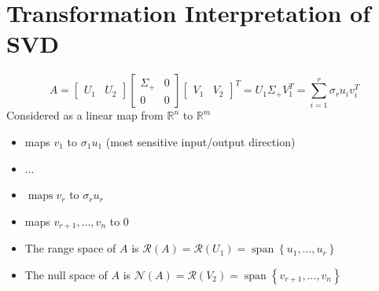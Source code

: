 \documentclass[10pt,a4paper,oneside]{article}
\begin{document}
\section{Transformation Interpretation of SVD}
\[
A=\left[\begin{array}{ll}{U_{1}} & {U_{2}}\end{array}\right]\left[\begin{array}{cc}{\Sigma_{+}} & {0} \\ {0} & {0}\end{array}\right]\left[\begin{array}{ll}{V_{1}} & {V_{2}}\end{array}\right]^{T}=U_{1} \Sigma_{+} V_{1}^{T}=\sum_{i=1}^{r} \sigma_{r} u_{i} v_{i}^{T}
\]
Considered as a linear map from $\mathbb{R}^{n}$ to $\mathbb{R}^{m}$
\begin{itemize}
\item maps $v_{1}$ to $\sigma_{1} u_{1}$ (most sensitive input/output direction)
\item ...
\item $\operatorname{maps} v_{r}$ to $\sigma_{r} u_{r}$
\item maps $v_{r+1}, \dots, v_{n}$ to 0
\item The range space of $A$ is $\mathcal{R}(A)=\mathcal{R}\left(U_{1}\right)=\operatorname{span}\left\{u_{1}, \ldots, u_{r}\right\}$
\item The null space of $A$ is $\mathcal{N}(A)=\mathcal{R}\left(V_{2}\right)=\operatorname{span}\left\{v_{r+1}, \ldots, v_{n}\right\}$
\end{itemize}
\end{document}
